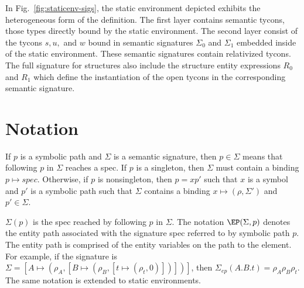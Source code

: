In Fig.~\ref{fig:staticenv-sigs}, the static environment depicted
exhibits the heterogeneous form of the definition. The first layer
contains semantic tycons, those types directly bound by the static
environment. The second layer consist of the tycons $s, u,$ and $w$ bound in semantic
signatures $\Sigma_0$ and $\Sigma_1$ embedded inside of the static
environment. These semantic signatures contain relativized tycons. The
full signature for structures also include the structure entity
expressions $R_0$ and $R_1$ which define the instantiation of the open
tycons in the corresponding semantic signature.  


\section{Notation}\label{sec:elabnotation}

If $p$ is a symbolic path and $\Sigma$ is a semantic signature, then $p\in\Sigma$ means that following $p$ in $\Sigma$ reaches a spec. If $p$ is a singleton, then $\Sigma$ must contain a binding $p\mapsto spec$. Otherwise, if $p$ is nonsingleton, then $p=xp'$ such that $x$ is a symbol and $p'$ is a symbolic path such that $\Sigma$ contains a binding $x\mapsto (\rho,\Sigma')$ and $p'\in\Sigma$. 

$\Sigma(p)$ is the spec reached by following $p$ in $\Sigma$. The notation $\EP(\Sigma,p)$ denotes the entity path associated with the signature spec referred to by symbolic path $p$. The entity path is comprised of the entity variables on the path to the element. For example, if the signature is $\Sigma = [A\mapsto(\rho_A,[B\mapsto (\rho_B, [t \mapsto (\rho_t, 0)])])]$, then $\Sigma_{ep}(A.B.t) = \rho_A\rho_B\rho_t$. The same notation is extended to static environments. 

